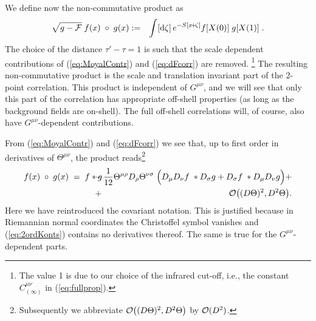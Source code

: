 \documentclass[a4paper,12pt]{article}
\newcommand {\ud} {\mathrm{d}}
\newcommand {\cF} {{\cal F}}
\newcommand {\cO}{{\cal O}}
\newcommand {\Back}{\!\!\!\!\!}
\begin{document}
We define now the non-commutative product as
\begin{eqnarray}
  \label{eq:defKonts}
  \sqrt {g-\cF} \; f(x) \; \circ \; g(x)
  &:=& \int [\ud \zeta]\, e^{-S[x\!+\!\zeta]}
  f[X(0)] \; g[X(1)] \; .
\end{eqnarray}
The choice of the distance $\tau'-\tau = 1$ is such that the scale
dependent contributions of (\ref{eq:MoyalContr}) and (\ref{eq:dFcorr})
are removed.%
\footnote{%
	The value 1 is due to our choice of the infrared cut-off, i.e., 
	the constant $C^{\mu\nu}_{(\infty)}$ in (\ref{eq:fullprop}).}
The resulting non-commutative product is the scale and translation invariant
part of the 2-point correlation. This product is independent of $G^{\mu\nu}$, 
and we 
will see that only this part of the correlation has appropriate off-shell 
properties
(as long as the background fields are on-shell). The full off-shell 
correlations will, of course, also have $G^{\mu\nu}$-dependent contributions.




{}From (\ref{eq:MoyalContr}) and (\ref{eq:dFcorr}) we see that, up to first 
order in derivatives of $\Theta^{\mu\nu}$, the product 
reads\footnote{Subsequently we abbreviate 
$\cO\bigl((D\Theta)^2,D^2\Theta\bigr)$ by $\cO(D^2)$.}
\begin{eqnarray}
  \label{eq:2ordKonts}
  f(x) \; \circ \; g(x) \;=\; f * g 
  \Back&-&\Back \frac 1{12}
              \Theta^{\mu\rho} D_\rho \Theta^{\nu\sigma} \;
              \Bigl(D_\mu D_\nu f \;* D_\sigma g +
                    D_\sigma f \;* D_\mu D_\nu g \Bigr) +\nonumber\\
  &+& \cO\bigl((D\Theta)^2,D^2\Theta\bigr) .
\end{eqnarray}
Here we have reintroduced the covariant notation. This is justified
because in Riemannian normal coordinates the Christoffel symbol 
vanishes 
and (\ref{eq:2ordKonts}) contains no derivatives thereof.
The same is true for the $G^{\mu\nu}$-dependent parts.
\end{document}
